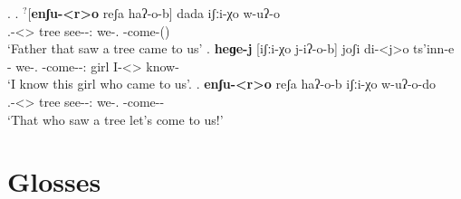 \ex.  
	\ag. $^?$[\textbf{enʃu-<r>o} reʃa haʔ-o-b] dada iʃːi-χo w-uʔ-o\\
		{\Rfl.\Obl-<\Nans>\Aff} tree {see-\Pst-\Ptcp:\Pst} {we-\Add.\Lat} {\M-come-\Pst(\Aor)}\\
		\glt `Father that saw a tree came to us' \label{rfl-resumptive}
	\bg. \textbf{heɡe-j} [iʃːi-χo j-iʔ-o-b] joʃi di-<j>o ts'inn-e\\
		{\Dem-\F} {we-\Add.\Lat} {\M-come-\Pst-\Ptcp:\Pst} girl {I-<\F>\Aff} {know-\Hab}\\
		\glt `I know this girl who came to us'. \label{dem-resumptive}
	\bg. \textbf{enʃu-<r>o} reʃa haʔ-o-b iʃːi-χo w-uʔ-o-do\\
		{\Rfl.\Obl-<\Nans>\Aff} tree {see-\Pst-\Ptcp:\Pst} {we-\Add.\Lat} {\M-come-\Imp-\Jus}\\
		\glt `That who saw a tree let's come to us!' \label{resumptive?}

\section*{Glosses}
\small
\printglosses


\normalsize
